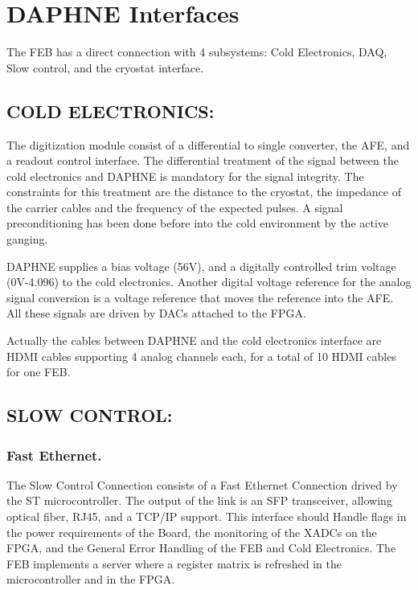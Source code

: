 \section{DAPHNE Interfaces}
\label{sec:interfaces}

The FEB has a direct connection with 4 subsystems: Cold Electronics, DAQ, Slow control, and the cryostat interface.

\subsection{COLD ELECTRONICS:}

The digitization module consist of a differential to single converter, the AFE, and a readout control interface. The differential treatment of the signal between the cold electronics and DAPHNE is mandatory for the signal integrity. The constraints for this treatment are the distance to the cryostat, the impedance of the carrier cables and the frequency of the expected pulses.  A signal preconditioning has been done before into the cold environment by the active ganging. 

DAPHNE supplies a bias voltage (56V), and a digitally controlled trim voltage (0V-4.096) to the cold electronics. Another digital voltage reference for the analog signal conversion is a voltage reference that moves the reference into the AFE. All these signals are driven by DACs attached to the FPGA.

Actually the cables between DAPHNE and the cold electronics interface are HDMI cables supporting 4 analog channels each, for a total of 10 HDMI cables for one FEB. 

\subsection{SLOW CONTROL: }

\subsubsection{Fast Ethernet.}
The Slow Control Connection consists of a Fast Ethernet Connection drived by the ST microcontroller.
The output of the link is an SFP transceiver, allowing optical fiber, RJ45, and a TCP/IP support.
This interface should Handle flags in the power requirements of the Board, the monitoring of the XADCs on the FPGA, and the General Error Handling of the FEB and Cold Electronics. 
The FEB implements a server where a register matrix is refreshed in the microcontroller and in the FPGA.

